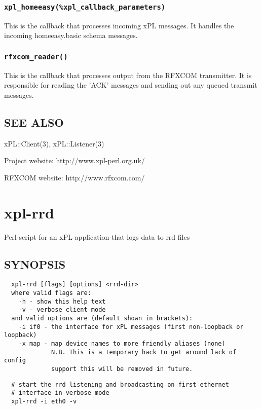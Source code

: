 \subsubsection*{\texttt{xpl\_homeeasy(\%xpl\_callback\_parameters)}\label{xpl-rfxcom-trans_xpl_homeeasy_xpl_callback_parameters_}}


This is the callback that processes incoming xPL messages.  It handles
the incoming homeeasy.basic schema messages.

\subsubsection*{\texttt{rfxcom\_reader()}\label{xpl-rfxcom-trans_rfxcom_reader_}}


This is the callback that processes output from the RFXCOM transmitter.
It is responsible for reading the 'ACK' messages and sending out any
queued transmit messages.

\subsection*{SEE ALSO\label{xpl-rfxcom-trans_SEE_ALSO}}


xPL::Client(3), xPL::Listener(3)



Project website: http://www.xpl-perl.org.uk/



RFXCOM website: http://www.rfxcom.com/

\section{xpl-rrd\label{xpl-rrd}}


Perl script for an xPL application that logs data to rrd files

\subsection*{SYNOPSIS\label{xpl-rrd_SYNOPSIS}}
\begin{verbatim}
  xpl-rrd [flags] [options] <rrd-dir>
  where valid flags are:
    -h - show this help text
    -v - verbose client mode
  and valid options are (default shown in brackets):
    -i if0 - the interface for xPL messages (first non-loopback or loopback)
    -x map - map device names to more friendly aliases (none)
             N.B. This is a temporary hack to get around lack of config
             support this will be removed in future.
\end{verbatim}
\begin{verbatim}
  # start the rrd listening and broadcasting on first ethernet
  # interface in verbose mode
  xpl-rrd -i eth0 -v
\end{verbatim}
